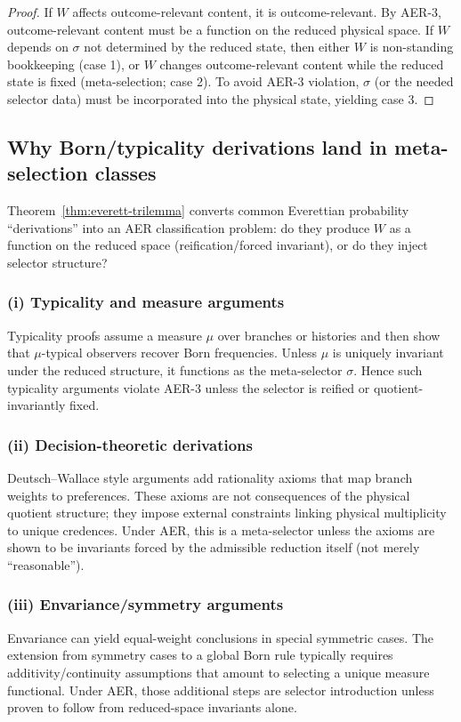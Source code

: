 \documentclass[11pt]{article}
\theoremstyle{remark}
\theoremstyle{plain}
\begin{document}
\begin{proof}
If $W$ affects outcome-relevant content, it is outcome-relevant. By AER-3, outcome-relevant content must be a function on the reduced physical space.
If $W$ depends on $\sigma$ not determined by the reduced state, then either $W$ is non-standing bookkeeping (case 1),
or $W$ changes outcome-relevant content while the reduced state is fixed (meta-selection; case 2).
To avoid AER-3 violation, $\sigma$ (or the needed selector data) must be incorporated into the physical state, yielding case 3.
\end{proof}

\subsection{Why Born/typicality derivations land in meta-selection classes}

Theorem~\ref{thm:everett-trilemma} converts common Everettian probability ``derivations'' into an AER classification problem:
do they produce $W$ as a function on the reduced space (reification/forced invariant), or do they inject selector structure?

\subsubsection*{(i) Typicality and measure arguments}
Typicality proofs assume a measure $\mu$ over branches or histories and then show that $\mu$-typical observers recover Born frequencies.
Unless $\mu$ is uniquely invariant under the reduced structure, it functions as the meta-selector $\sigma$.
Hence such typicality arguments violate AER-3 unless the selector is reified or quotient-invariantly fixed.

\subsubsection*{(ii) Decision-theoretic derivations}
Deutsch--Wallace style arguments add rationality axioms that map branch weights to preferences.
These axioms are not consequences of the physical quotient structure; they impose external constraints
linking physical multiplicity to unique credences. Under AER, this is a meta-selector unless the axioms are shown to be invariants
forced by the admissible reduction itself (not merely ``reasonable'').

\subsubsection*{(iii) Envariance/symmetry arguments}
Envariance can yield equal-weight conclusions in special symmetric cases.
The extension from symmetry cases to a global Born rule typically requires additivity/continuity assumptions
that amount to selecting a unique measure functional. Under AER, those additional steps are selector introduction
unless proven to follow from reduced-space invariants alone.
\end{document}
